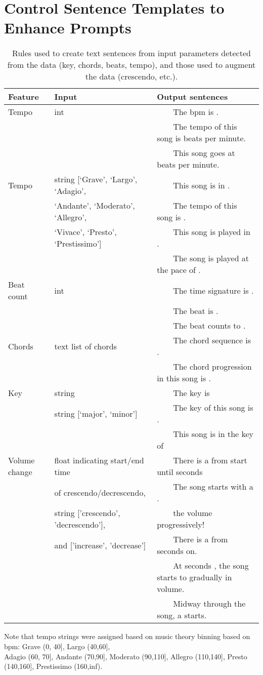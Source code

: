 \documentclass[11pt]{article}
\newcommand{\tabitem}{~~\llap{\textbullet}~~}
\begin{document}
\clearpage
\FloatBarrier
\section{Control Sentence Templates to Enhance Prompts}
\label{sec:controlcaptions}

\begin{table}[h] \footnotesize
\caption{Rules used to create text sentences from input parameters detected from the data (key, chords, beats, tempo), and those used to augment the data (crescendo, etc.). }
\begin{tabular}{@{}lll@{}}
\toprule
Feature & Input   & Output sentences  \\
\midrule
Tempo & int  & \tabitem The bpm is . \\
& & \tabitem The tempo of this song is  beats per minute.\\
& & \tabitem This song goes at  beats per minute.\\
\midrule
Tempo & string  [`Grave', `Largo', `Adagio', & \tabitem This song is in .\\
& `Andante', `Moderato', `Allegro',  & \tabitem The tempo of this song is .\\
& `Vivace', `Presto', `Prestissimo']& \tabitem This song is played in .\\
& & \tabitem The song is played at the pace of .\\
\midrule
Beat count& int  & \tabitem The time signature is .\\
& & \tabitem The beat is .\\
& & \tabitem The beat counts to .\\
\midrule
Chords&  text list of chords  & \tabitem The chord sequence is . \\
& & \tabitem The chord progression in this song is .\\
\midrule
Key& string   & \tabitem The key is  \\
& string  [`major', `minor'] & \tabitem The key of this song is  .\\
& & \tabitem This song is in the key of  \\
\midrule
Volume change& float  indicating start/end time  & \tabitem There is a  from start until  seconds \\
& of crescendo/decrescendo, & \tabitem The song starts with a .\\
& string   ['crescendo', 'decrescendo'], & \tabitem  the volume progressively!\\
& and  ['increase', 'decrease'] & \tabitem There is a  from  seconds on.\\
& & \tabitem At seconds , the song starts to gradually  in volume.\\
& & \tabitem Midway through the song, a  starts.\\
\bottomrule
\end{tabular}

Note that tempo strings  were assigned based on music theory binning based on bpm: Grave {(0, 40]}, Largo {(40,60]}, \\ Adagio {(60, 70]}, Andante {(70,90]}, 
Moderato {(90,110]}, 
Allegro {(110,140]}, 
Presto {(140,160]}, 
Prestissimo {(160,inf)}. 
\end{table}
\end{document}

